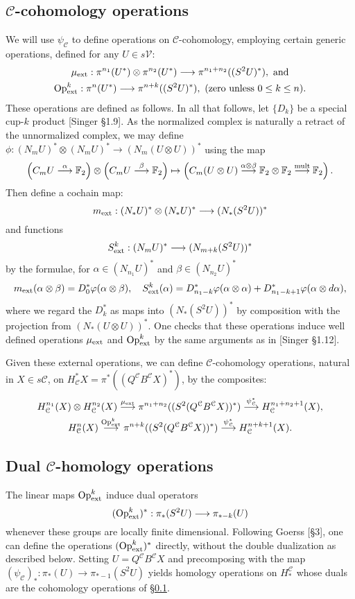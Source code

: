 \documentclass[11pt]{amsart}
\theoremstyle{plain}
\theoremstyle{definition}
\let\oldphi\phi
\let\phi\varphi
\renewcommand{\to}{\longrightarrow}
\newcommand{\calC}{\mathcal{C}}
\newcommand{\calV}{\mathcal{V}}
\theoremstyle{plain}
\newcommand{\ExtCohOp}{\textup{Op}_\textup{ext}}
\newcommand{\ExtCohProd}{\mu_\textup{ext}}
\newcommand{\F}{\mathbb{F}}
\begin{document}
\begin{Conventions and notation}
\subsection{$\calC$-cohomology operations}\label{generic coh ops section}
We will use $\psi_\calC$ to define operations on $\calC$-cohomology, employing certain generic operations, defined for any $U\in s\calV$:
\begin{gather*}
\ExtCohProd:\pi^{n_1}(U^*)\otimes \pi^{n_2}(U^*)\to \pi^{n_1+n_2}((S^2U)^*),\textup{ and}\\
\ExtCohOp^k:\pi^{n}(U^*)\to \pi^{n+k}((S^2U)^*),\textup{ (zero unless $0\leq k\leq n$).}
\end{gather*}
These operations are defined as follows. In all that follows, let $\{D_k\}$ be a special cup-$k$ product [Singer \S1.9]. As the normalized complex is naturally a retract of the unnormalized complex, we may define $\oldphi:\left(N_mU\right)^*\otimes \left(N_mU\right)^*\to \left(N_m(U\otimes U)\right)^*$ using the map
\[\left(C_mU\overset{\alpha}{\to}\F_2\right)\otimes \left(C_mU\overset{\beta}{\to}\F_2\right)\mapsto\left(C_m(U\otimes U)\overset{\alpha\otimes\beta}{\to}\F_2\otimes \F_2\overset{\textup{mult}}{\to}\F_2\right).\]
Then define a cochain map:
\[m_\textup{ext}:(N_*U)^*\otimes (N_*U)^*\to (N_*(S^2U))^*\]
and functions
\[S^k_\textup{ext}:(N_mU)^*\to (N_{m+k}(S^2U))^*\]
by the formulae, for $\alpha\in (N_{n_1}U)^*$ and $\beta\in (N_{n_2}U)^*$
\[m_\textup{ext}(\alpha\otimes\beta)=D_0^*\oldphi(\alpha\otimes\beta),\quad S^k_\textup{ext}(\alpha)=D^*_{n_1-k}\oldphi(\alpha\otimes \alpha)+D^*_{n_1-k+1}\oldphi(\alpha\otimes d\alpha),\]
where we regard the $D^*_k$ as maps into $(N_*(S^2U))^*$ by composition with the projection from $(N_*(U\otimes U))^*$. One checks that these operations induce well defined operations $\ExtCohProd$ and $\ExtCohOp^k$ by the same arguments as in [Singer \S1.12].

Given these external operations, we can define $\calC$-cohomology operations, natural in $X\in s\calC$, on $H^*_\calC X=\pi^*((Q^\calC B^\calC X)^*)$, by the composites:
\begin{gather*}
H_\calC^{n_1}(X)\otimes H_\calC^{n_2}(X)\overset{\ExtCohProd}{\to} \pi^{n_1+n_2}((S^2(Q^\calC B^\calC X))^*)\overset{\psi_\calC^*}{\to} H_\calC^{n_1+n_2+1}(X),\\
H_\calC^{n}(X)\overset{\ExtCohOp^k}{\to} \pi^{n+k}((S^2(Q^\calC B^\calC X))^*)\overset{\psi_\calC^*}{\to} H_\calC^{n+k+1}(X).
\end{gather*}
\subsection{Dual $\calC$-homology operations}
The linear maps $\ExtCohOp^k$ induce dual operators
\[(\ExtCohOp^k)^*:\pi_*(S^2U)\to \pi_{*-k}(U)\]
whenever these groups are locally finite dimensional. Following Goerss [\S3], one can define the operations $(\ExtCohOp^k)^*$ directly, without the double dualization as described below. Setting $U=Q^{\calC}B^{\calC}X$ and precomposing with the map $(\psi_\calC)_*:\pi_*(U)\to\pi_{*-1}(S^2U)$ yields homology operations on $H_*^\calC$ whose duals are the cohomology operations of \S\ref{generic coh ops section}.


\end{Conventions and notation}
\end{document}
